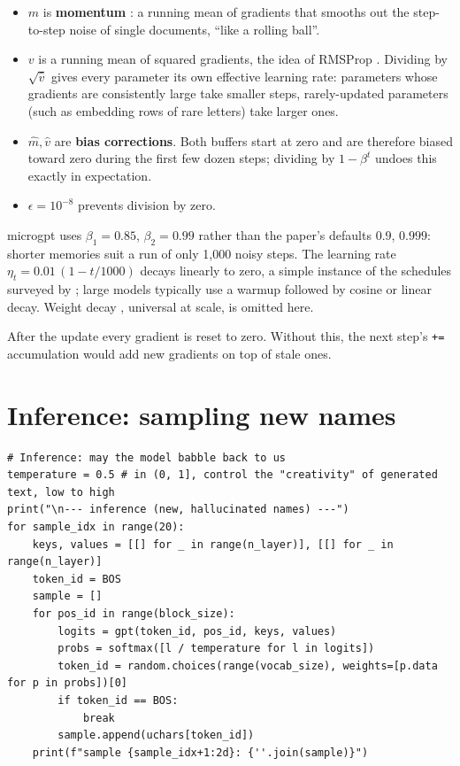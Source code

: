 \documentclass[11pt,letterpaper]{article}
\theoremstyle{remark}
\newcommand{\code}[1]{\lstinline[basicstyle=\ttfamily\small]|#1|}
\begin{document}
\begin{itemize}[leftmargin=2em]
  \item $m$ is \textbf{momentum} \parencite{polyak1964momentum}: a running mean of gradients that smooths out the step-to-step noise of single documents, ``like a rolling ball''.
  \item $v$ is a running mean of squared gradients, the idea of RMSProp \parencite{tieleman2012rmsprop}. Dividing by $\sqrt{\hat v}$ gives every parameter its own effective learning rate: parameters whose gradients are consistently large take smaller steps, rarely-updated parameters (such as embedding rows of rare letters) take larger ones.
  \item $\hat m,\hat v$ are \textbf{bias corrections}. Both buffers start at zero and are therefore biased toward zero during the first few dozen steps; dividing by $1-\beta^{t}$ undoes this exactly in expectation.
  \item $\epsilon=10^{-8}$ prevents division by zero.
\end{itemize}

microgpt uses $\beta_1=0.85$, $\beta_2=0.99$ rather than the paper's defaults $0.9$, $0.999$: shorter memories suit a run of only 1{,}000 noisy steps. The learning rate $\eta_t = 0.01\,(1 - t/1000)$ decays linearly to zero, a simple instance of the schedules surveyed by \textcite{loshchilov2017sgdr}; large models typically use a warmup followed by cosine or linear decay. Weight decay \parencite{loshchilov2019adamw}, universal at scale, is omitted here.

After the update every gradient is reset to zero. Without this, the next step's \code{+=} accumulation would add new gradients on top of stale ones.

\section{Inference: sampling new names}
\label{sec:inference}

\begin{lstlisting}
# Inference: may the model babble back to us
temperature = 0.5 # in (0, 1], control the "creativity" of generated text, low to high
print("\n--- inference (new, hallucinated names) ---")
for sample_idx in range(20):
    keys, values = [[] for _ in range(n_layer)], [[] for _ in range(n_layer)]
    token_id = BOS
    sample = []
    for pos_id in range(block_size):
        logits = gpt(token_id, pos_id, keys, values)
        probs = softmax([l / temperature for l in logits])
        token_id = random.choices(range(vocab_size), weights=[p.data for p in probs])[0]
        if token_id == BOS:
            break
        sample.append(uchars[token_id])
    print(f"sample {sample_idx+1:2d}: {''.join(sample)}")
\end{lstlisting}
\end{document}
